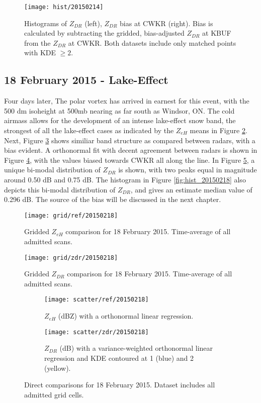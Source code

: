 \begin{figure}[p]
\texttt{[image: hist/20150214]}\centering
\caption{Histograms of $Z_{DR}$ (left), $Z_{DR}$ bias at CWKR (right). Bias is calculated by subtracting the gridded, bias-adjusted $Z_{DR}$ at KBUF from the
$Z_{DR}$ at CWKR. Both datasets include only matched points with KDE $\geq 2$.} 
\label{fig:hist_20150214}
\end{figure}

\subsection{18 February 2015 - Lake-Effect}
Four days later, The polar vortex has arrived in earnest for this event, with the 500 dm isoheight at 500mb nearing as far south as Windsor, ON. The cold airmass allows for the development of an intense lake-effect snow band, the strongest of all the lake-effect cases as indicated by the $Z_{eH}$ means in Figure \ref{fig:grid_ref_20150218}. Next, Figure \ref{fig:grid_zdr_20150218} shows similiar band structure as compared between radars, with a bias evident. A orthonormal fit with decent agreement between radars is shown in Figure \ref{fig:scatter_ref_20150218}, with the values biased towards CWKR all along the line. In Figure \ref{fig:scatter_zdr_20150218}, a unique bi-modal distribution of $Z_{DR}$ is shown, with two peaks equal in magnitude around 0.50 dB and 0.75 dB. The histogram in Figure \ref{fig:hist_20150218} also depicts this bi-modal distribution of $Z_{DR}$, and gives an estimate median value of 0.296 dB. The source of the bias will be discussed in the next chapter. 
\begin{figure}[H]
\texttt{[image: grid/ref/20150218]}
\caption{Gridded $Z_{eH}$ comparison for 18 February 2015. Time-average of all admitted scans.} 
\label{fig:grid_ref_20150218}
\end{figure}

\begin{figure}[p]
\texttt{[image: grid/zdr/20150218]}
\caption{Gridded $Z_{DR}$ comparison for 18 February 2015. Time-average of all admitted scans.} 
\label{fig:grid_zdr_20150218}
\end{figure}

\begin{figure}[p]
\centering
   \begin{subfigure}[t]{0.48\linewidth} \centering
     \texttt{[image: scatter/ref/20150218]}
     \caption{$Z_{eH}$ (dBZ) with a orthonormal linear regression.}\label{fig:scatter_ref_20150218}
   \end{subfigure}
   \begin{subfigure}[t]{0.48\linewidth} \centering
     \texttt{[image: scatter/zdr/20150218]}
     \caption{$Z_{DR}$ (dB) with a variance-weighted orthonormal linear regression and KDE contoured at 1 (blue) and 2 (yellow).}\label{fig:scatter_zdr_20150218}
   \end{subfigure}
\caption{Direct comparisons for 18 February 2015. Dataset includes all admitted grid cells.} \label{fig:scatter_20150218}
\end{figure}

